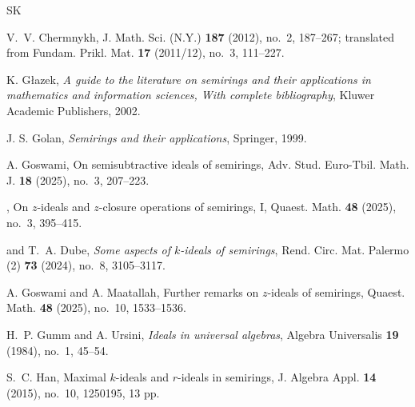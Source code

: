 \documentclass[11pt,english]{amsart}
\theoremstyle{definition}
\numberwithin{equation}{section}
\begin{document}
\begin{thebibliography}{SK}
	
	
	
	

 V.~V. Chermnykh, J. Math. Sci. (N.Y.) {\bf 187} (2012), no.~2, 187--267; translated from Fundam. Prikl. Mat. {\bf 17} (2011/12), no.~3, 111--227.
    
 K. G\l azek, \textit{A guide to the literature on semirings and their applications in mathematics and information sciences, With complete bibliography}, Kluwer Academic Publishers, 2002.

 J. S. Golan, \textit{Semirings and their applications}, Springer, 1999.

 A. Goswami, On semisubtractive ideals of semirings, Adv. Stud. Euro-Tbil. Math. J. {\bf 18} (2025), no.~3, 207--223.

 \bysame, On $z$-ideals and $z$-closure operations of semirings, I, Quaest. Math. {\bf 48} (2025), no.~3, 395--415.

 \bysame and T.~A. Dube, \textit{Some aspects of $k$-ideals of semirings}, Rend. Circ. Mat. Palermo (2) {\bf 73} (2024), no.~8, 3105--3117.


 A. Goswami and A. Maatallah, Further remarks on $z$-ideals of semirings, Quaest. Math. {\bf 48} (2025), no.~10, 1533--1536.

 H.~P. Gumm and A. Ursini, \textit{Ideals in universal algebras}, Algebra Universalis {\bf 19} (1984), no.~1, 45--54.

 S.~C. Han, Maximal $k$-ideals and $r$-ideals in semirings, J. Algebra Appl. {\bf 14} (2015), no.~10, 1250195, 13 pp.


\end{thebibliography}
\end{document}
